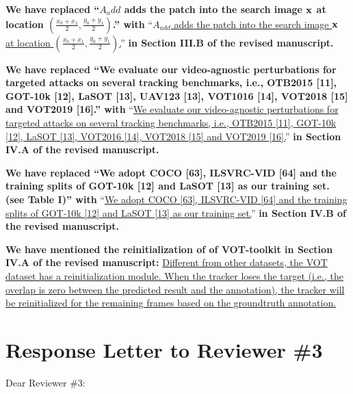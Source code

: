 \documentclass[12pt]{article}
\newcommand{\ie}{i.e.}
\begin{document}
\textbf{We have  replaced ``$A_add$ adds the patch into the search image $\textbf x$ at location $(\frac{x_0+x_1}{2},\frac{y_0+y_1}{2})$.'' with}
``\uline{$A_{add}$ adds the patch into the search image $\textbf x$ at location $(\frac{x_0+x_1}{2},\frac{y_0+y_1}{2})$.}''
\textbf{in Section III.B of the revised manuscript.}

\textbf{We have replaced ``We evaluate our video-agnostic perturbations for targeted attacks on several tracking benchmarks, i.e., OTB2015 [11], GOT-10k [12], LaSOT [13], UAV123 [13], VOT1016 [14], VOT2018 [15] and VOT2019 [16].'' with}
``\uline{We evaluate our video-agnostic perturbations for targeted attacks on several tracking benchmarks, i.e., OTB2015 [11], GOT-10k [12], LaSOT [13], VOT2016 [14], VOT2018 [15] and VOT2019 [16].}''
\textbf{in Section IV.A of the revised manuscript.}

\textbf{We have replaced ``We adopt COCO [63], ILSVRC-VID [64] and the training splits of GOT-10k [12] and LaSOT [13] as our training set. (see Table I)'' with}
``\uline{We adopt COCO [63], ILSVRC-VID [64] and the training splits of GOT-10k [12] and LaSOT [13] as our training set.}''
\textbf{in Section IV.B of the revised manuscript.}

\textbf{We have mentioned the reinitialization of of VOT-toolkit in Section IV.A of the revised manuscript:}
\uline{Different from other datasets, the VOT dataset has a reinitialization module. When the tracker loses the target (\ie, the overlap is zero between the predicted result and the annotation), the tracker will be reinitialized for the remaining frames based on the groundtruth annotation.}

\clearpage
\newpage
{\centering\section*{Response Letter to Reviewer \#3}}
\noindent Dear Reviewer \#3:
\end{document}
